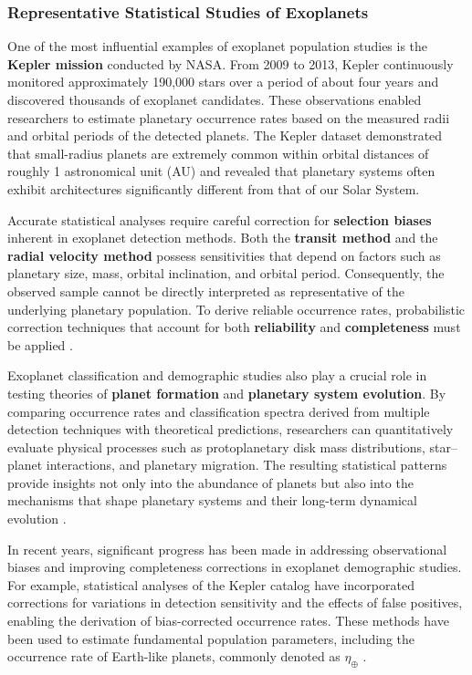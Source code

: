 \subsubsection{Representative Statistical Studies of Exoplanets}

One of the most influential examples of exoplanet population studies is the \textbf{Kepler mission} conducted by NASA. From 2009 to 2013, Kepler continuously monitored approximately 190,000 stars over a period of about four years and discovered thousands of exoplanet candidates. These observations enabled researchers to estimate planetary occurrence rates based on the measured radii and orbital periods of the detected planets. The Kepler dataset demonstrated that small-radius planets are extremely common within orbital distances of roughly 1 astronomical unit (AU) and revealed that planetary systems often exhibit architectures significantly different from that of our Solar System.

Accurate statistical analyses require careful correction for \textbf{selection biases} inherent in exoplanet detection methods. Both the \textbf{transit method} and the \textbf{radial velocity method} possess sensitivities that depend on factors such as planetary size, mass, orbital inclination, and orbital period. Consequently, the observed sample cannot be directly interpreted as representative of the underlying planetary population. To derive reliable occurrence rates, probabilistic correction techniques that account for both \textbf{reliability} and \textbf{completeness} must be applied \cite{bryson2021}.

Exoplanet classification and demographic studies also play a crucial role in testing theories of \textbf{planet formation} and \textbf{planetary system evolution}. By comparing occurrence rates and classification spectra derived from multiple detection techniques with theoretical predictions, researchers can quantitatively evaluate physical processes such as protoplanetary disk mass distributions, star--planet interactions, and planetary migration. The resulting statistical patterns provide insights not only into the abundance of planets but also into the mechanisms that shape planetary systems and their long-term dynamical evolution \cite{gaudi2021}.

In recent years, significant progress has been made in addressing observational biases and improving completeness corrections in exoplanet demographic studies. For example, statistical analyses of the Kepler catalog have incorporated corrections for variations in detection sensitivity and the effects of false positives, enabling the derivation of bias-corrected occurrence rates. These methods have been used to estimate fundamental population parameters, including the occurrence rate of Earth-like planets, commonly denoted as \textbf{$\eta_{\oplus}$} \cite{bryson2021}.

